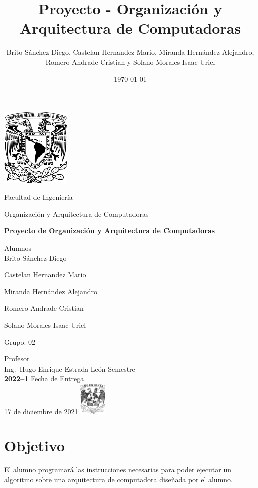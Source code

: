 \documentclass{IEEEtran}
\author{Brito Sánchez Diego, Castelan Hernandez Mario, Miranda Hernández Alejandro, Romero Andrade Cristian y Solano Morales Isaac Uriel}
\date{\today}
\title{Proyecto - Organización y Arquitectura de Computadoras}
\begin{document}
\begin{titlepage}
\centering
\includegraphics[width=0.25\textwidth]{./img_common/unam_logo}\vspace{0.5cm}\\
{\scshape{\Huge Facultad de Ingeniería\par{}}}\vspace{0.25cm}
{\scshape{\Large Organización y Arquitectura de Computadoras\par{}}}\vfill{}
{\huge \textbf{Proyecto de Organización y Arquitectura de Computadoras}}\vfill{}
{\Large Alumnos\\
Brito Sánchez Diego

Castelan Hernandez Mario

Miranda Hernández Alejandro

Romero Andrade Cristian

Solano Morales Isaac Uriel

}\vfill{}
{\large Grupo: 02\par{}}\vfill{}
{\large Profesor\\Ing.~Hugo Enrique Estrada León}\vfill{}
\vfil{}
{\large Semestre\\\textbf{2022--1}}
\vfill{}
{\large Fecha de Entrega\\17 de diciembre de 2021}
\vfill{}
\includegraphics[width=0.1\textwidth]{./img_common/inge_logo}
\end{titlepage}

\maketitle
\tableofcontents

\section{Objetivo}
\label{sec:org5588967}
El alumno programará las instrucciones necesarias para poder ejecutar un algoritmo sobre una arquitectura de computadora  diseñada por el alumno.
\end{document}
